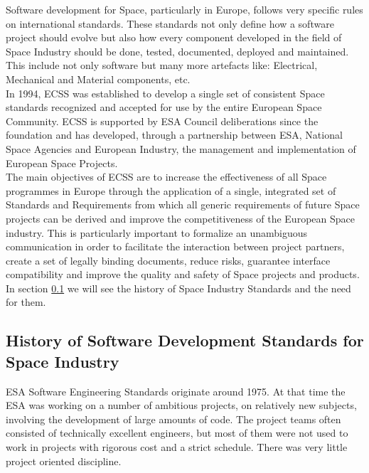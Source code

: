 Software development for Space, particularly in Europe, follows very specific rules on international standards. These standards not only define how a software project should
evolve but also how every component developed in the field of Space Industry should be done, tested, documented, deployed and maintained.
This include not only software but many more artefacts like: Electrical, Mechanical and Material components, etc.\\
In 1994, \ac{ECSS} was established to develop a single set of consistent Space standards recognized and accepted for use by the entire European Space Community.
\ac{ECSS} is supported by \ac{ESA} Council deliberations since the foundation and has developed, through
a partnership between \ac{ESA}, National Space Agencies and European Industry, the management and implementation of European Space Projects.\\
The main objectives of \ac{ECSS} are to increase the effectiveness of all Space programmes in Europe through the application of a
single, integrated set of Standards and Requirements from which all generic requirements of future Space projects can be derived and
improve the competitiveness of the European Space industry.
This is particularly important to formalize an unambiguous communication in order to facilitate the interaction between project partners,
create a set of legally binding documents, reduce risks, guarantee interface compatibility and
improve the quality and safety of Space projects and products.\\
In section \ref{sec:historyspace} we will see the history of Space Industry Standards and the need for them.

\subsection{History of Software Development Standards for Space Industry}\label{sec:historyspace}
\ac{ESA} Software Engineering Standards originate around 1975. At
that time the \ac{ESA} was working on a number of ambitious projects, on relatively new subjects, involving the development of
large amounts of code. The project teams often consisted of technically excellent engineers, but most of them were not used to work in projects with
rigorous cost and a strict schedule. There was very little project oriented discipline\cite{esa-bulletin-90}.\\

